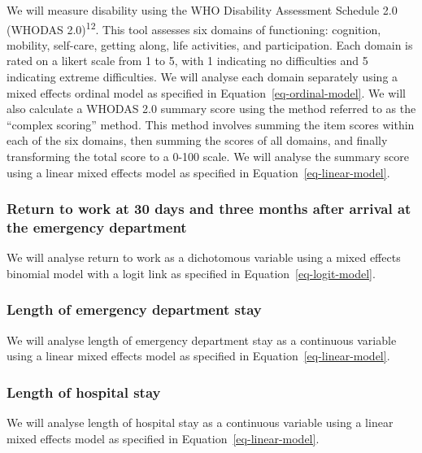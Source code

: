 \documentclass[
]{scrartcl}
\begin{document}
We will measure disability using the WHO Disability Assessment Schedule
2.0 (WHODAS 2.0)\textsuperscript{12}. This tool assesses six domains of
functioning: cognition, mobility, self-care, getting along, life
activities, and participation. Each domain is rated on a likert scale
from 1 to 5, with 1 indicating no difficulties and 5 indicating extreme
difficulties. We will analyse each domain separately using a mixed
effects ordinal model as specified in Equation~\ref{eq-ordinal-model}.
We will also calculate a WHODAS 2.0 summary score using the method
referred to as the ``complex scoring'' method. This method involves
summing the item scores within each of the six domains, then summing the
scores of all domains, and finally transforming the total score to a
0-100 scale. We will analyse the summary score using a linear mixed
effects model as specified in Equation~\ref{eq-linear-model}.

\hypertarget{return-to-work-at-30-days-and-three-months-after-arrival-at-the-emergency-department}{%
\subsubsection{Return to work at 30 days and three months after arrival
at the emergency
department}\label{return-to-work-at-30-days-and-three-months-after-arrival-at-the-emergency-department}}

We will analyse return to work as a dichotomous variable using a mixed
effects binomial model with a logit link as specified in
Equation~\ref{eq-logit-model}.

\hypertarget{length-of-emergency-department-stay}{%
\subsubsection{Length of emergency department
stay}\label{length-of-emergency-department-stay}}

We will analyse length of emergency department stay as a continuous
variable using a linear mixed effects model as specified in
Equation~\ref{eq-linear-model}.

\hypertarget{length-of-hospital-stay}{%
\subsubsection{Length of hospital stay}\label{length-of-hospital-stay}}

We will analyse length of hospital stay as a continuous variable using a
linear mixed effects model as specified in
Equation~\ref{eq-linear-model}.
\end{document}
